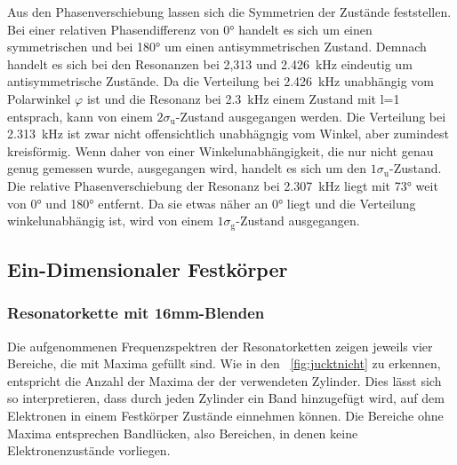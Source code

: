             Aus den Phasenverschiebung lassen sich die Symmetrien der Zustände feststellen. Bei einer relativen Phasendifferenz von 0° handelt es sich um einen symmetrischen und bei 180° um einen 
            antisymmetrischen Zustand. Demnach handelt es sich bei den Resonanzen bei 2,313 und \SI{2.426}{\kilo\hertz} eindeutig um antisymmetrische Zustände. Da die Verteilung bei \SI{2.426}{\kilo\hertz} 
            unabhängig vom Polarwinkel $\varphi$ ist und die Resonanz bei \SI{2.3}{\kilo\hertz} einem Zustand mit l=1 entsprach, kann von einem $2\sigma_{\text{u}}$-Zustand ausgegangen werden. Die Verteilung 
            bei \SI{2.313}{\kilo\hertz} ist zwar nicht offensichtlich unabhägngig vom Winkel, aber zumindest kreisförmig. Wenn daher von einer Winkelunabhängigkeit, die nur nicht genau genug gemessen wurde, 
            ausgegangen wird, handelt es sich um den $1\sigma_{\text{u}}$-Zustand. Die relative Phasenverschiebung der Resonanz bei \SI{2.307}{\kilo\hertz} liegt mit 73° weit von 0° und 180° 
            entfernt. Da sie etwas näher an 0° liegt und die Verteilung winkelunabhängig ist, wird von einem $1\sigma_{\text{g}}$-Zustand ausgegangen. 

    \newpage
    \subsection{Ein-Dimensionaler Festkörper}
        \subsubsection*{Resonatorkette mit 16mm-Blenden}
            Die aufgenommenen Frequenzspektren der Resonatorketten zeigen jeweils vier Bereiche, die mit Maxima gefüllt sind. Wie in den 
            ~\autoref{fig:jucktnicht} zu erkennen, entspricht die Anzahl der Maxima der der verwendeten Zylinder. Dies lässt sich so 
            interpretieren, dass durch jeden Zylinder ein Band hinzugefügt wird, auf dem Elektronen in einem Festkörper Zustände einnehmen können. Die Bereiche ohne Maxima entsprechen Bandlücken, also Bereichen,
            in denen keine Elektronenzustände vorliegen.     
            
